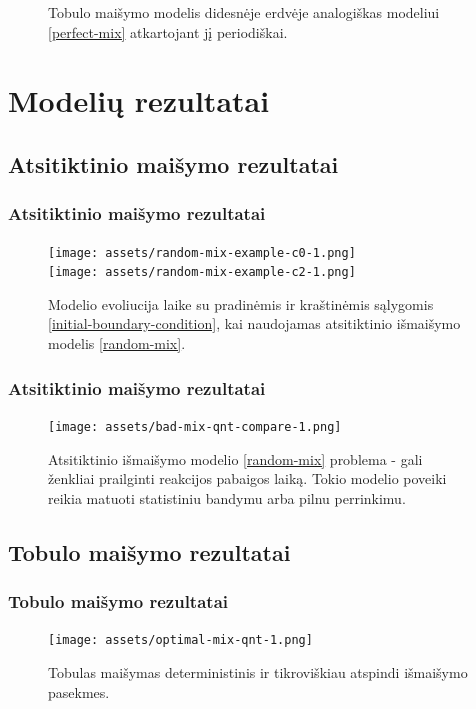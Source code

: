 \documentclass{beamer}
\begin{document}
\begin{frame}
\begin{figure}
    \caption{Tobulo maišymo modelis didesnėje erdvėje analogiškas modeliui \eqref{perfect-mix} atkartojant jį periodiškai.}
    \label{large-perfect-mix}
\end{figure}
\end{frame}

\section{Modelių rezultatai}

\subsection{Atsitiktinio maišymo rezultatai}
\begin{frame}
    \frametitle{Atsitiktinio maišymo rezultatai}
    \begin{figure}
        \centering
        \texttt{[image: assets/random-mix-example-c0-1.png]} \\
        \texttt{[image: assets/random-mix-example-c2-1.png]}
        \caption{Modelio evoliucija laike su pradinėmis ir kraštinėmis sąlygomis \eqref{initial-boundary-condition}, kai naudojamas atsitiktinio išmaišymo modelis \eqref{random-mix}.}
    \end{figure}
\end{frame}

\begin{frame}
    \frametitle{Atsitiktinio maišymo rezultatai}
    \begin{figure}
        \centering
        \texttt{[image: assets/bad-mix-qnt-compare-1.png]}
        \caption{Atsitiktinio išmaišymo modelio \eqref{random-mix} problema - gali ženkliai prailginti reakcijos pabaigos laiką. Tokio modelio poveiki reikia matuoti statistiniu bandymu arba pilnu perrinkimu. }
    \end{figure}
\end{frame}

\subsection{Tobulo maišymo rezultatai}
\begin{frame}
\frametitle{Tobulo maišymo rezultatai}
\begin{figure}
\centering
\texttt{[image: assets/optimal-mix-qnt-1.png]}
\caption{Tobulas maišymas deterministinis ir tikroviškiau atspindi išmaišymo pasekmes.}
\end{figure}
\end{frame}
\end{document}
